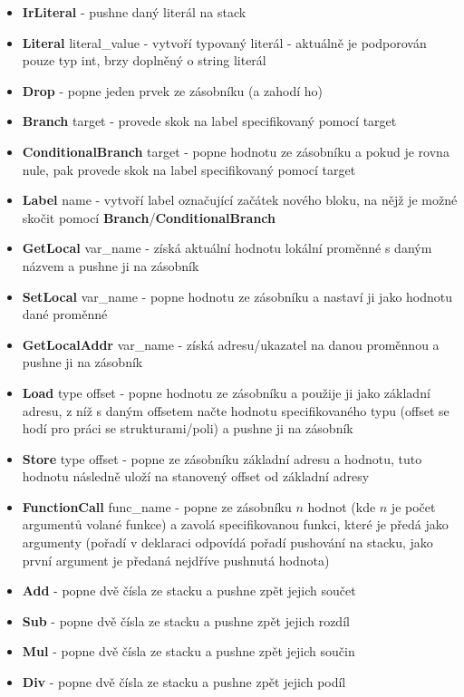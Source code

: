 \documentclass{article}
\begin{document}
\begin{itemize} 
    \item \textbf{IrLiteral} - pushne daný literál na stack
    \item \textbf{Literal} literal\_value - vytvoří typovaný literál - aktuálně je podporován pouze typ int, brzy doplněný o string literál 
    \item \textbf{Drop} - popne jeden prvek ze zásobníku (a zahodí ho)
    \item \textbf{Branch} target - provede skok na label specifikovaný pomocí target
    \item \textbf{ConditionalBranch} target - popne hodnotu ze zásobníku a pokud je rovna nule, pak provede skok na label specifikovaný pomocí target
    \item \textbf{Label} name - vytvoří label označující začátek nového bloku, na nějž je možné skočit pomocí \textbf{Branch}/\textbf{ConditionalBranch}
    \item \textbf{GetLocal} var\_name - získá aktuální hodnotu lokální proměnné s daným názvem a pushne ji na zásobník
    \item \textbf{SetLocal} var\_name - popne hodnotu ze zásobníku a nastaví ji jako hodnotu dané proměnné
    \item \textbf{GetLocalAddr} var\_name - získá adresu/ukazatel na danou proměnnou a pushne ji na zásobník
    \item \textbf{Load} type offset - popne hodnotu ze zásobníku a použije ji jako základní adresu, z níž s daným offsetem načte hodnotu specifikovaného typu (offset se hodí pro práci se strukturami/poli) a pushne ji na zásobník
    \item \textbf{Store} type offset - popne ze zásobníku základní adresu a hodnotu, tuto hodnotu následně uloží na stanovený offset od základní adresy
    \item \textbf{FunctionCall} func\_name - popne ze zásobníku $n$ hodnot (kde $n$ je počet argumentů volané funkce) a zavolá specifikovanou funkci, které je předá jako argumenty (pořadí v deklaraci odpovídá pořadí pushování na stacku, jako první argument je předaná nejdříve pushnutá hodnota)
    \item \textbf{Add} - popne dvě čísla ze stacku a pushne zpět jejich součet
    \item \textbf{Sub} - popne dvě čísla ze stacku a pushne zpět jejich rozdíl
    \item \textbf{Mul} - popne dvě čísla ze stacku a pushne zpět jejich součin
    \item \textbf{Div} - popne dvě čísla ze stacku a pushne zpět jejich podíl

\end{itemize}
\end{document}
